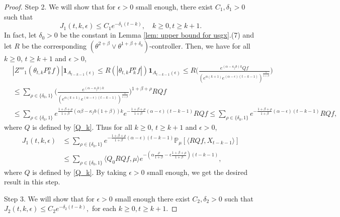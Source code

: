 \documentclass[12pt,a4paper]{amsart}
\theoremstyle{plain}
\theoremstyle{definition}
\numberwithin{equation}{section}
\begin{document}
\begin{proof}
Step 2. We will show that for $\epsilon>0$ small enough, there exist  $C_1, \delta_1>0$ such that
\begin{equation}
  \label{lemma31q}
  J_1(t,k,\epsilon)
  \leq C_1e^{-\delta_1 (t-k)},
  \quad k\geq 0, t\geq k+1.
\end{equation}
In fact, let $\delta_0 >0$ be the constant in Lemma \ref{lem: upper bound for usgx}.(7) and let $R$ be the corresponding $(\theta^{2+\beta}\vee \theta^{1+\beta+\delta_0})$-controller.
Then, we have for all $k\geq 0$, $t\geq k+1$ and $\epsilon> 0$,
\begin{align}
  & |Z'''_1(\theta_{t,k}P^\alpha_k f)|\mathbf{1}_{A_{t-k-1}(\epsilon)}
    \leq R(|\theta_{t,k}P^\alpha_k f|)\mathbf{1}_{A_{t-k-1}(\epsilon)}
  \leq R \Big(\frac{e^{(\alpha-\kappa_fb)k} Qf}{(e^{\alpha (k+1)}e^{(\alpha-\epsilon)(t-k-1)})^\frac{1}{1+\beta}}\Big) \\
  & \leq \sum_{\rho \in \{\delta_0, 1\}}\Big(\frac{e^{(\alpha-\kappa_fb)k}}{(e^{\alpha (k+1)}e^{(\alpha-\epsilon)(t-k-1)})^\frac{1}{1+\beta}}\Big)^{1+\beta+ \rho} RQf \\
  & \leq\sum_{\rho \in \{\delta_0, 1\}}e^{\frac{1+\beta + \rho}{1+\beta}(\alpha\beta-\kappa_fb(1+\beta))k}e^{-\frac{1+\beta+\rho}{1+\beta} (\alpha-\epsilon)(t-k-1)}RQf
    \leq \sum_{\rho \in \{\delta_0,1\}}e^{-\frac{1+\beta+\rho}{1+\beta}(\alpha-\epsilon)(t-k-1)}RQf,
\end{align}
where $Q$ is defined by \eqref{Q_k}.
Thus for all $k\geq 0$, $t\geq k+1$ and $\epsilon> 0$,
\begin{align}
  \label{eq: estimate of J1}
  J_1(t,k,\epsilon)
  & \leq \sum_{\rho \in \{\delta_0,1\}}e^{-\frac{1+\beta+\rho}{1+\beta}(\alpha-\epsilon)(t-k-1)}\mathbb{P}_{\mu}[\langle RQf,X_{t-k-1}\rangle]\\
  & \leq \sum_{\rho \in \{\delta_0,1\}} \langle Q_0 RQf, \mu \rangle e^{-(\alpha\frac{\rho}{1+\beta}-\epsilon\frac{1+\beta+\rho}{1+\beta})(t-k-1)},
\end{align}
where $Q$ is defined by \eqref{Q_k}.
By taking $\epsilon>0$ small enough, we get the desired result in this step.

Step 3.
We will show that for $\epsilon>0$ small enough there exist $C_2, \delta_2>0$ such that $ J_2(t,k,\epsilon) \leq C_2e^{-\delta_2 (t-k)},$ for each $k\geq 0, t\geq k+1.$


\end{proof}
\end{document}
